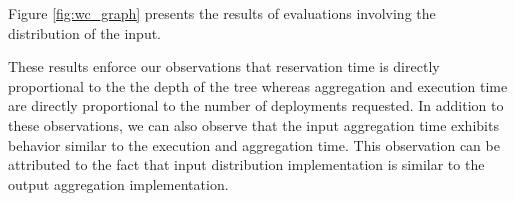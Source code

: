 Figure \ref{fig:wc_graph} presents the results of evaluations involving the
distribution of the input.


These results enforce our observations that reservation time is directly
proportional to the the depth of the tree whereas aggregation and execution time
are directly proportional to the number of deployments requested.  In addition
to these observations, we can also observe that the input aggregation time exhibits 
behavior similar to the execution and aggregation time.  This observation can be
attributed to the fact that input distribution implementation is similar
to the output aggregation implementation.  

%
%

